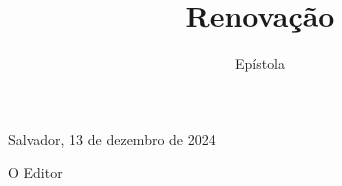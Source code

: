 \documentclass[onecolumn]{hipatia}
\title{Renovação}
\subtitle{Epístola}
\author{}
\begin{document}
\setcounter{page}{\epistolapage}
\maketitle
\leftskip=2.5cm
\rightskip=2.5cm


\hspace{1cm}


\hfill Salvador, 13 de dezembro de 2024

\hfill O Editor
\end{document}
